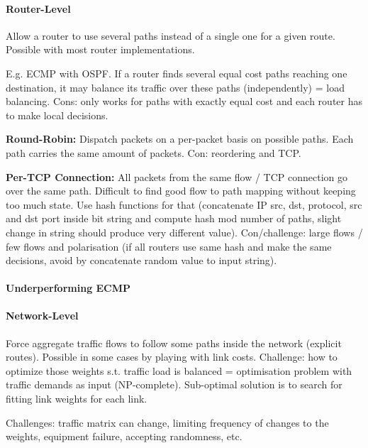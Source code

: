 \paragraph{Router-Level}
Allow a router to use several paths instead of a single one for a given route. Possible with most router implementations.

E.g. ECMP with OSPF. If a router finds several equal cost paths reaching one destination, it may balance its traffic over these paths (independently) = load balancing. Cons: only works for paths with exactly equal cost and each router has to make local decisions.

\textbf{Round-Robin:} Dispatch packets on a per-packet basis on possible paths. Each path carries the same amount of packets. Con: reordering and TCP.

\textbf{Per-TCP Connection:} All packets from the same flow / TCP connection go over the same path. Difficult to find good flow to path mapping without keeping too much state. Use hash functions for that (concatenate IP src, dst, protocol, src and dst port inside bit string and compute hash mod number of paths, slight change in string should produce very different value). Con/challenge: large flows / few flows and polarisation (if all routers use same hash and make the same decisions, avoid by concatenate random value to input string).

\paragraph{Underperforming ECMP}

\paragraph{Network-Level}
Force aggregate traffic flows to follow some paths inside the network (explicit routes). Possible in some cases by playing with link costs. Challenge: how to optimize those weights s.t. traffic load is balanced = optimisation problem with traffic demands as input (NP-complete). Sub-optimal solution is to search for fitting link weights for each link.

Challenges: traffic matrix can change, limiting frequency of changes to the weights, equipment failure, accepting randomness, etc.



